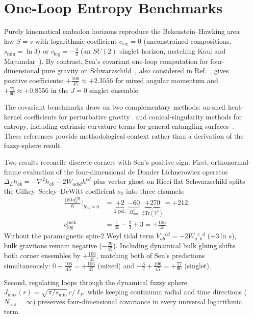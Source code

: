 \documentclass[onecolumn,11pt,aps,prd,amsmath,amssymb,nofootinbib,floatfix]{revtex4-2}
\newcommand{\lP}{\ell_P}
\newcommand{\Tr}{\mathrm{Tr}}
\begin{document}
\section{One-Loop Entropy Benchmarks}\label{sec:1loop}

Purely kinematical embadon horizons reproduce the Bekenstein--Hawking area law $S=s$ with logarithmic coefficient $c_{\log}=0$ (unconstrained compositions, $s_{\min}=\ln 3$) or $c_{\log}=-\frac{3}{2}$ (an $SU(2)$ singlet horizon, matching Kaul and Majumdar~\cite{KaulMajumdar2000}). By contrast, Sen's covariant one-loop computation for four-dimensional pure gravity on Schwarzschild~\cite{Sen2013}, also considered in Ref.~\cite{Chandrasekaran2026}, gives positive coefficients: $+\frac{106}{45}\approx +2.3556$ for mixed angular momentum and $+\frac{77}{90}\approx +0.8556$ in the $J=0$ singlet ensemble.



The covariant benchmarks draw on two complementary methods: on-shell heat-kernel coefficients for perturbative gravity~\cite{BBM2022} and conical-singularity methods for entropy, including extrinsic-curvature terms for general entangling surfaces~\cite{FPS2013}. These references provide methodological context rather than a derivation of the fuzzy-sphere result.

Two results reconcile discrete corners with Sen's positive sign. First, orthonormal-frame evaluation of the four-dimensional de Donder Lichnerowicz operator $\Delta_L h_{ab}=-\nabla^2 h_{ab}-2W_{acbd}h^{cd}$ plus vector ghost on Ricci-flat Schwarzschild splits the Gilkey--Seeley--DeWitt coefficient $a_2$ into three channels:
\begin{align}\label{eq:lich_flip}
\frac{180\,a_2^{\mathrm{GR}}}{K}\Big|_{R_{ab}=0} &= \underbrace{+2}_{\text{2 pol.}} \;\underbrace{-60}_{\Omega_{mn}^2} \;\underbrace{+270}_{\frac{1}{2}\Tr(V^2)} = +212, \nonumber\\
c_{\log}^{\mathrm{bulk}} &= \frac{1}{45}-\frac{2}{3}+3 = +\frac{106}{45}.
\end{align}
Without the paramagnetic spin-2 Weyl tidal term $V_{ab}{}^{cd}=-2W_a{}^c{}_b{}^d$ ($+3\ln s$), bulk gravitons remain negative ($-\frac{29}{45}$). Including dynamical bulk gluing shifts both corner ensembles by $+\frac{106}{45}$, matching both of Sen's predictions simultaneously: $0+\frac{106}{45}=+\frac{106}{45}$ (mixed) and $-\frac{3}{2}+\frac{106}{45}=+\frac{77}{90}$ (singlet).

Second, regulating loops through the dynamical fuzzy sphere $J_{\max}(r)=\sqrt{\pi/s_{\min}}\,r/\lP$ while keeping continuum radial and time directions ($N_{\mathrm{rad}}=\infty$) preserves four-dimensional covariance in every universal logarithmic term.
\end{document}
